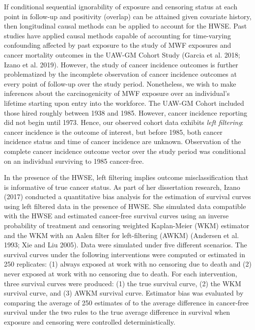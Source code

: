 \documentclass[
  11pt,
]{article}
\begin{document}
If conditional sequential ignorability of exposure and censoring status
at each point in follow-up and positivity (overlap) can be attained
given covariate history, then longitudinal causal methods can be applied
to account for the HWSE. Past studies have applied causal methods
capable of accounting for time-varying confounding affected by past
exposure to the study of MWF exposures and cancer mortality outcomes in
the UAW-GM Cohort Study (Garcia et al. 2018; Izano et al. 2019).
However, the study of cancer incidence outcomes is further problematized
by the incomplete observation of cancer incidence outcomes at every
point of follow-up over the study period. Nonetheless, we wish to make
inferences about the carcinogenicity of MWF exposure over an
individual's lifetime starting upon entry into the workforce. The UAW-GM
Cohort included those hired roughly between 1938 and 1985. However,
cancer incidence reporting did not begin until 1973. Hence, our observed
cohort data exhibits \emph{left filtering}: cancer incidence is the
outcome of interest, but before 1985, both cancer incidence status and
time of cancer incidence are unknown. Observation of the complete cancer
incidence outcome vector over the study period was conditional on an
individual surviving to 1985 cancer-free.

In the presence of the HWSE, left filtering implies outcome
misclassification that is informative of true cancer status. As part of
her dissertation research, Izano (2017) conducted a quantitative bias
analysis for the estimation of survival curves using left filtered data
in the presence of HWSE. She simulated data compatible with the HWSE and
estimated cancer-free survival curves using an inverse probability of
treatment and censoring weighted Kaplan-Meier (WKM) estimator and the
WKM with an Aalen filter for left-filtering (AWKM) (Andersen et al.
1993; Xie and Liu 2005). Data were simulated under five different
scenarios. The survival curves under the following interventions were
computed or estimated in 250 replicates: (1) always exposed at work with
no censoring due to death and (2) never exposed at work with no
censoring due to death. For each intervention, three survival curves
were produced: (1) the true survival curve, (2) the WKM survival curve,
and (3) AWKM survival curve. Estimator bias was evaluated by comparing
the average of 250 estimates of to the average difference in cancer-free
survival under the two rules to the true average difference in survival
when exposure and censoring were controlled deterministically.
\end{document}
